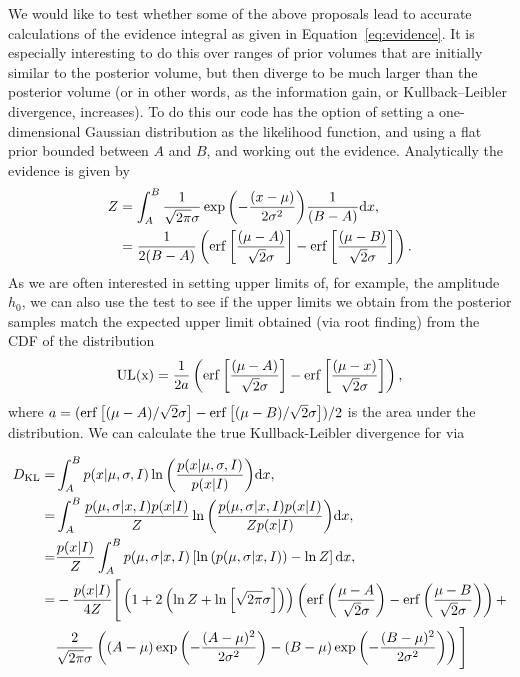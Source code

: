 We would like to test whether some of the above proposals lead to accurate calculations of the evidence integral as given in Equation~\ref{eq:evidence}.
It is especially interesting to do this over ranges of prior volumes that are initially similar to the posterior volume, but then diverge to be
much larger than the posterior volume (or in other words, as the information gain, or Kullback–Leibler divergence, increases). To do this our
code has the option of setting a one-dimensional Gaussian distribution as the likelihood function, and using a flat prior bounded between $A$ and $B$,
and working out the evidence. Analytically the evidence is given by
\begin{align}\label{eq:testgaussev}
 Z &= \int_A^B \frac{1}{\sqrt{2\pi}\sigma}\exp{\left(-\frac{(x-\mu)}{2\sigma^2} \right)}\frac{1}{(B-A)} {\rm d}x, \nonumber \\
   &= \frac{1}{2(B-A)}\left(\operatorname{erf}{\left[\frac{(\mu-A)}{\sqrt{2}\sigma}\right]}-\operatorname{erf}{\left[\frac{(\mu-B)}{\sqrt{2}\sigma}\right]}\right).
\end{align}
As we are often interested in setting upper limits of, for example, the \gw amplitude $h_0$, we can also use the test to see if the
upper limits we obtain from the posterior samples match the expected upper limit obtained (via root finding) from the CDF of the distribution
\begin{equation}\label{eq:testcdf}
 {\rm UL(x)} = \frac{1}{2a}\left(\operatorname{erf}{\left[\frac{(\mu-A)}{\sqrt{2}\sigma}\right]} - \operatorname{erf}{\left[\frac{(\mu-x)}{\sqrt{2}\sigma}\right]}\right),
\end{equation}
where $a = (\operatorname{erf}{\left[(\mu - A)/\sqrt{2}\sigma\right]} - \operatorname{erf}{\left[(\mu - B)/\sqrt{2}\sigma\right]})/2$ is the area under the distribution.
We can calculate the true Kullback-Leibler divergence for via
\begin{widetext}
\begin{align}\label{eq:kldiv}
D_{\rm KL} =& \int_A^B p(x|\mu,\sigma,I) \ln{\left(\frac{p(x|\mu,\sigma,I)}{p(x|I)}\right)} {\rm d}x, \nonumber \\ 
 =& \int_A^B \frac{p(\mu,\sigma|x,I)p(x|I)}{Z} \ln{\left(\frac{p(\mu,\sigma|x,I)p(x|I)}{Zp(x|I)}\right)} {\rm d}x, \nonumber \\
 =& \frac{p(x|I)}{Z} \int_A^B p(\mu,\sigma|x,I) \left[\ln{\left( p(\mu,\sigma|x,I) \right)} - \ln{Z}\right] {\rm d}x, \nonumber \\
 =& -\frac{p(x|I)}{4Z}\Bigg[ \left(1+2\left(\ln{Z} 
+\ln{\left[\sqrt{2\pi}\sigma\right]}\right)\right)\left(\operatorname{erf}{\left(\frac{\mu-A}{\sqrt{2}\sigma}\right)}-\operatorname{erf}{\left(\frac{\mu-B}{\sqrt{2}\sigma}\right)} \right) + \nonumber \\
 & \frac{2}{\sqrt{2\pi}\sigma}\left((A-\mu)\exp{\left(-\frac{(A-\mu)^2}{2\sigma^2}\right)} - (B-\mu)\exp{\left(-\frac{(B-\mu)^2}{2\sigma^2}\right)}  \right) \Bigg]
\end{align}
\end{widetext}
